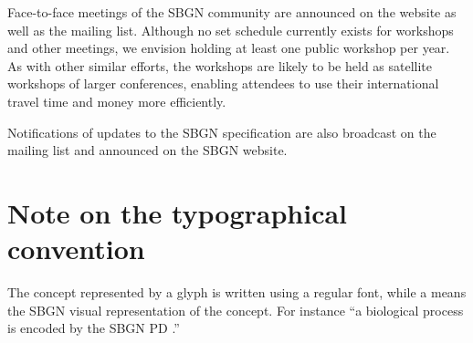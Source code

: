 Face-to-face meetings of the SBGN community are announced on the website as 
well as the mailing list.  Although no set schedule currently exists for 
workshops and other meetings, we envision holding at least one public 
workshop per year.  As with other similar efforts, the workshops are likely 
to be held as satellite workshops of larger conferences, enabling attendees 
to use their international travel time and money more efficiently.

Notifications of updates to the SBGN specification are also broadcast on 
the mailing list and announced on the SBGN website.

\section{Note on the typographical convention}
The concept represented by a glyph is written using a regular font, while a 
 means the SBGN visual representation of the concept. For 
instance ``a biological process is encoded by the SBGN PD .''

